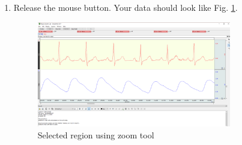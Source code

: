 \documentclass{article}
\begin{document}
\begin{enumerate}
	\item Release the mouse button. Your data should look like Fig. \ref{selected_cycles}.
		\begin{figure}[h]
		\includegraphics[width=0.8\textwidth]{../images/BIOPAC_23.png}
		\centering
		\caption{Selected region using zoom tool}
		\label{selected_cycles}
		\end{figure}	
\end{enumerate}
\end{document}
